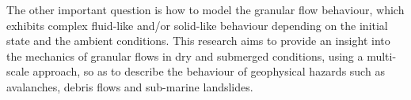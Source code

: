 The other important question is how to model the granular flow behaviour, which 
exhibits complex fluid-like and/or solid-like behaviour depending on the 
initial state and the ambient conditions. This research aims to 
provide an insight into the mechanics of granular flows in dry and 
submerged conditions, using a multi-scale approach, so as to describe the 
behaviour of geophysical hazards such as avalanches, debris flows and 
sub-marine landslides.

